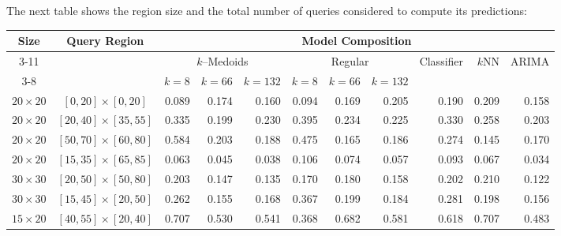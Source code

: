 The next table shows the region size and the total number of queries considered to compute its predictions:

\begin{table}[h]	\centering
	\tiny
	\begin{tabular}{|c|c|r|r|r|r|r|r|r|r|r|}
		\hline
		\multirow{3}{*}{Size} & \multirow{3}{*}{Query Region} & \multicolumn{9}{c|}{Model Composition} \\ 
		\cline{3-11}
		& & \multicolumn{3}{c|}{$k$--Medoids} & \multicolumn{3}{c|}{Regular} & \multirow{2}{*}{Classifier} & \multirow{2}{*}{$k$NN} & \multirow{2}{*}{ARIMA} \\ 
		\cline{3-8}
		& & $k =8$ & $k = 66$ & $k = 132$ & $k=8$  & $k = 66$ & $k = 132$ &  & & \\ \hline %
		$20 \times 20$ & $[ 0, 20] \times [ 0, 20]$ & 0.089 & 0.174 & 0.160 & 0.094 & 0.169 & 0.205 & 0.190 & 0.209 & 0.158  \\ %
		$20 \times 20$ & $[20, 40] \times [35, 55]$ & 0.335 & 0.199 & 0.230 & 0.395 & 0.234 & 0.225 & 0.330 & 0.258 & 0.203 \\ %
		$20 \times 20$ & $[50, 70] \times [60, 80]$ & 0.584 & 0.203 & 0.188 & 0.475 & 0.165 & 0.186 & 0.274 & 0.145 & 0.170 \\ %
		$20 \times 20$ & $[15, 35] \times [65, 85]$ & 0.063 & 0.045 & 0.038 & 0.106 & 0.074 & 0.057 & 0.093 & 0.067 & 0.034 \\ %
		$30 \times 30$ & $[20, 50] \times [50, 80]$ & 0.203 & 0.147 & 0.135 & 0.170 & 0.180 & 0.158 & 0.202 & 0.210 & 0.122 \\ %
		$30 \times 30$ & $[15, 45] \times [20, 50]$ & 0.262 & 0.155 & 0.168 & 0.367 & 0.199 & 0.184 & 0.281 & 0.198 & 0.156 \\ %
		$15 \times 20$ & $[40, 55] \times [20, 40]$ & 0.707 & 0.530 & 0.541 & 0.368 & 0.682 & 0.581 & 0.618 & 0.707 & 0.483 \\ %

\end{tabular}
\end{table}
